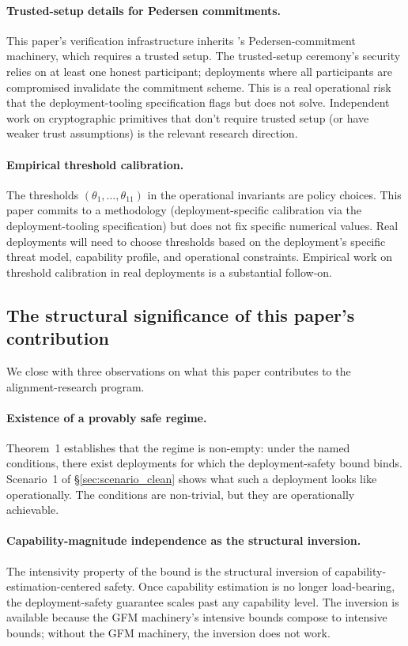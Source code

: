 \paragraph{Trusted-setup details for Pedersen commitments.}
This paper's verification infrastructure inherits \citep[Exogenous~Verification]{lasser2026exo}'s
Pedersen-commitment machinery, which requires a trusted setup.
The trusted-setup ceremony's security relies on at least one
honest participant; deployments where all participants are
compromised invalidate the commitment scheme. This is a real
operational risk that the deployment-tooling specification flags
but does not solve. Independent work on cryptographic primitives
that don't require trusted setup (or have weaker trust assumptions)
is the relevant research direction.

\paragraph{Empirical threshold calibration.}
The thresholds $(\theta_1, \ldots, \theta_{11})$ in the operational
invariants are policy choices. This paper commits to a methodology
(deployment-specific calibration via the deployment-tooling
specification) but does not fix specific numerical values. Real
deployments will need to choose thresholds based on the deployment's
specific threat model, capability profile, and operational
constraints. Empirical work on threshold calibration in real
deployments is a substantial follow-on.

\subsection{The structural significance of this paper's contribution}
\label{sec:disc_significance}

We close with three observations on what this paper contributes to
the alignment-research program.

\paragraph{Existence of a provably safe regime.}
Theorem~1 establishes that the regime is non-empty: under the
named conditions, there exist deployments for which the
deployment-safety bound binds. Scenario~1 of
\S\ref{sec:scenario_clean} shows what such a deployment looks like
operationally. The conditions are non-trivial, but they are
operationally achievable.

\paragraph{Capability-magnitude independence as the structural
inversion.}
The intensivity property of the bound is the structural inversion
of capability-estimation-centered safety. Once capability
estimation is no longer load-bearing, the deployment-safety
guarantee scales past any capability level. The inversion is
available because the GFM machinery's intensive bounds compose to
intensive bounds; without the GFM machinery, the inversion does not
work.

